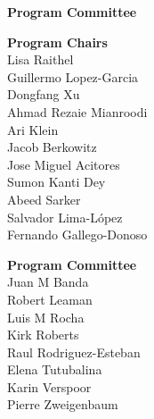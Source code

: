 \documentclass[11pt,oneside]{book}
\begin{document}
{}
\begin{center}
\Large \textbf{Program Committee}
\end{center}
\vspace*{1cm}
\begin{description}
  \item{\bf Program Chairs}\vspace{2mm}\\
            Lisa Raithel\\
          Guillermo Lopez-Garcia\\
          Dongfang Xu\\
          Ahmad Rezaie Mianroodi\\
          Ari Klein\\
          Jacob Berkowitz\\
          Jose Miguel Acitores\\
          Sumon Kanti Dey\\
          Abeed Sarker\\
          Salvador Lima-López\\
          Fernando Gallego-Donoso\\
      
  \item{\bf Program Committee}\vspace{2mm}\\
            Juan M Banda\\
          Robert Leaman\\
          Luis M Rocha\\
          Kirk Roberts\\
          Raul Rodriguez-Esteban\\
          Elena Tutubalina\\
          Karin Verspoor\\
          Pierre Zweigenbaum\\
      

\end{description}
\end{document}
